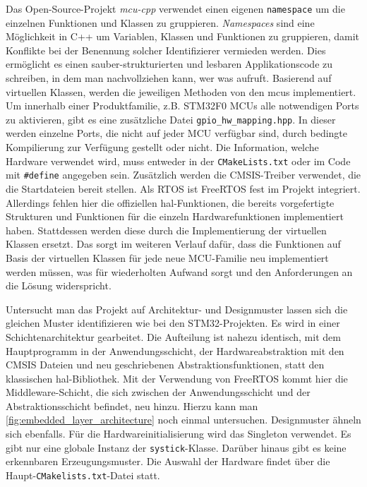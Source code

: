 Das Open-Source-Projekt \emph{mcu-cpp} \cite{github_mcu_cpp} verwendet einen eigenen \texttt{namespace} um die einzelnen Funktionen und Klassen zu gruppieren.
\emph{Namespaces} sind eine Möglichkeit in C++ um Variablen, Klassen und Funktionen zu gruppieren, damit Konflikte bei der Benennung solcher Identifizierer vermieden werden.
Dies ermöglicht es einen sauber-strukturierten und lesbaren Applikationscode zu schreiben, in dem man nachvollziehen kann, wer was aufruft.
Basierend auf virtuellen Klassen, werden die jeweiligen Methoden von den \gls{mcu}s implementiert.
Um innerhalb einer Produktfamilie, z.B. STM32F0 MCUs alle notwendigen Ports zu aktivieren, gibt es eine zusätzliche Datei \texttt{gpio\_hw\_mapping.hpp}.
In dieser werden einzelne Ports, die nicht auf jeder MCU verfügbar sind, durch bedingte Kompilierung zur Verfügung gestellt oder nicht.
Die Information, welche Hardware verwendet wird, muss entweder in der \texttt{CMakeLists.txt} oder im Code mit \texttt{\#define} angegeben sein.
Zusätzlich werden die CMSIS-Treiber verwendet, die die Startdateien bereit stellen.
Als RTOS ist FreeRTOS fest im Projekt integriert.
Allerdings fehlen hier die offiziellen \gls{hal}-Funktionen, die bereits vorgefertigte Strukturen und Funktionen für die einzeln Hardwarefunktionen implementiert haben.
Stattdessen werden diese durch die Implementierung der virtuellen Klassen ersetzt.
Das sorgt im weiteren Verlauf dafür, dass die Funktionen auf Basis der virtuellen Klassen für jede neue MCU-Familie neu implementiert werden müssen, was für wiederholten Aufwand sorgt und den Anforderungen an die Lösung widerspricht.

Untersucht man das Projekt auf Architektur- und Designmuster lassen sich die gleichen Muster identifizieren wie bei den STM32-Projekten.
Es wird in einer Schichtenarchitektur gearbeitet.
Die Aufteilung ist nahezu identisch, mit dem Hauptprogramm in der Anwendungsschicht, der Hardwareabstraktion mit den CMSIS Dateien und neu geschriebenen Abstraktionsfunktionen, statt den klassischen \gls{hal}-Bibliothek.
Mit der Verwendung von FreeRTOS kommt hier die Middleware-Schicht, die sich zwischen der Anwendungsschicht und der Abstraktionsschicht befindet, neu hinzu.
Hierzu kann man \cref{fig:embedded_layer_architecture} noch einmal untersuchen.
Designmuster ähneln sich ebenfalls.
Für die Hardwareinitialisierung wird das Singleton verwendet.
Es gibt nur eine globale Instanz der \texttt{systick}-Klasse.
Darüber hinaus gibt es keine erkennbaren Erzeugungsmuster.
Die Auswahl der Hardware findet über die Haupt-\texttt{CMakelists.txt}-Datei statt.

